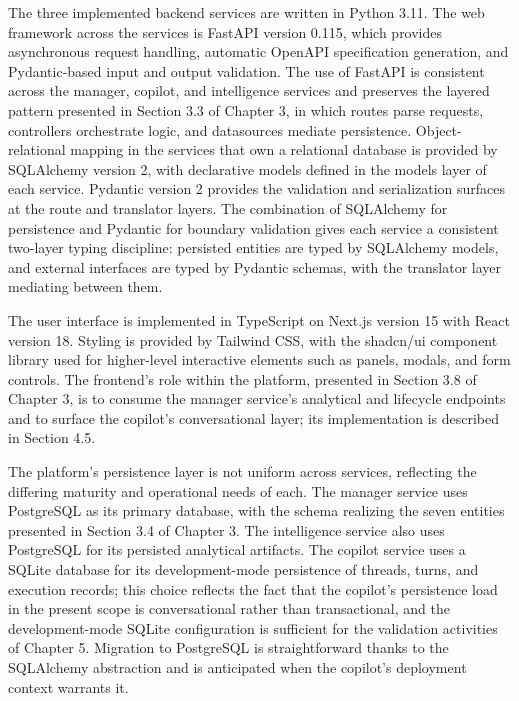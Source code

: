 The three implemented backend services are written in Python 3.11. The web framework across the services is FastAPI version 0.115, which provides asynchronous request handling, automatic OpenAPI specification generation, and Pydantic-based input and output validation. The use of FastAPI is consistent across the manager, copilot, and intelligence services and preserves the layered pattern presented in Section 3.3 of Chapter 3, in which routes parse requests, controllers orchestrate logic, and datasources mediate persistence. Object-relational mapping in the services that own a relational database is provided by SQLAlchemy version 2, with declarative models defined in the models layer of each service. Pydantic version 2 provides the validation and serialization surfaces at the route and translator layers. The combination of SQLAlchemy for persistence and Pydantic for boundary validation gives each service a consistent two-layer typing discipline: persisted entities are typed by SQLAlchemy models, and external interfaces are typed by Pydantic schemas, with the translator layer mediating between them.

The user interface is implemented in TypeScript on Next.js version 15 with React version 18. Styling is provided by Tailwind CSS, with the shadcn/ui component library used for higher-level interactive elements such as panels, modals, and form controls. The frontend's role within the platform, presented in Section 3.8 of Chapter 3, is to consume the manager service's analytical and lifecycle endpoints and to surface the copilot's conversational layer; its implementation is described in Section 4.5.

The platform's persistence layer is not uniform across services, reflecting the differing maturity and operational needs of each. The manager service uses PostgreSQL as its primary database, with the schema realizing the seven entities presented in Section 3.4 of Chapter 3. The intelligence service also uses PostgreSQL for its persisted analytical artifacts. The copilot service uses a SQLite database for its development-mode persistence of threads, turns, and execution records; this choice reflects the fact that the copilot's persistence load in the present scope is conversational rather than transactional, and the development-mode SQLite configuration is sufficient for the validation activities of Chapter 5. Migration to PostgreSQL is straightforward thanks to the SQLAlchemy abstraction and is anticipated when the copilot's deployment context warrants it.

